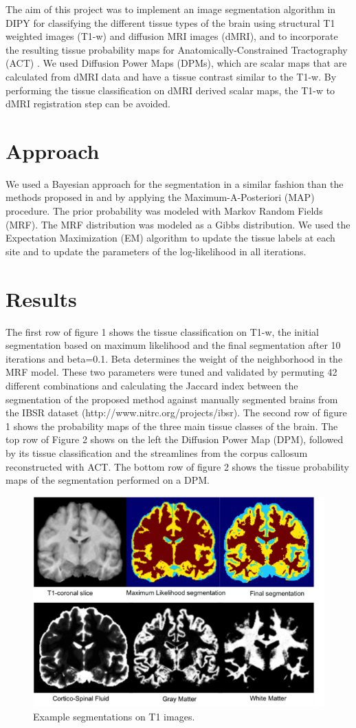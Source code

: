 \documentclass[twocolumn]{bmcart}%
\begin{document}
The aim of this project was to implement an image segmentation algorithm in DIPY
\cite{Garyfallidis2014} for classifying the different tissue types of
the brain using structural T1 weighted images (T1-w) and diffusion MRI images (dMRI), and to 
incorporate the resulting tissue probability maps for
Anatomically-Constrained Tractography (ACT) \cite{Smith20121924}. We used Diffusion Power Maps (DPMs), which are scalar maps that are calculated from dMRI data and have a tissue contrast similar to the T1-w. By performing the tissue classification on dMRI derived scalar maps, the T1-w to dMRI registration step can be avoided. 

\section{Approach}\label{approach}

We used a Bayesian approach for the segmentation in a similar fashion than the methods 
proposed in \cite{Zhang2001} and \cite{Avants2011} by applying the Maximum-A-Posteriori (MAP)
procedure. The prior probability was modeled with Markov Random Fields
(MRF). The MRF distribution was modeled as a Gibbs distribution. We used
the Expectation Maximization (EM) algorithm to update the tissue labels
at each site and to update the parameters of the log-likelihood in all
iterations.

\section{Results}\label{results}

The first row of figure 1 shows the tissue classification on T1-w, the
initial segmentation  based on maximum likelihood and the final segmentation after 10 iterations and
beta=0.1. Beta determines the weight of the neighborhood in the MRF
model. These two parameters were tuned and validated by permuting 42 different combinations and calculating the Jaccard index between the segmentation of the proposed method against manually segmented brains from the IBSR dataset (http://www.nitrc.org/projects/ibsr). The second row of figure 1 shows the probability maps of the three main tissue classes of the brain. The top row of Figure 2 shows on the left the Diffusion Power Map (DPM), followed by its tissue classification and the streamlines from the corpus callosum reconstructed with ACT. The bottom row of figure 2 shows the tissue probability maps of the segmentation performed on a DPM. 

\begin{figure}[h!]
  \includegraphics[width=.48\textwidth]{brainseg.png}
  \caption{\label{centfig} Example segmentations on T1 images.}
\end{figure}
\end{document}
